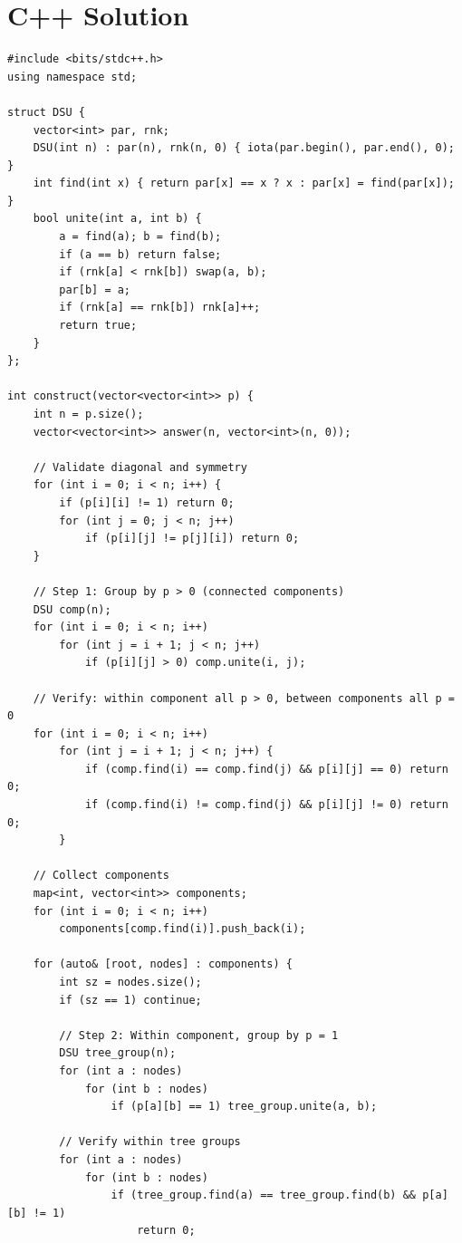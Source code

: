 \documentclass[11pt,a4paper]{article}
\begin{document}
\section{C++ Solution}

\begin{lstlisting}
#include <bits/stdc++.h>
using namespace std;

struct DSU {
    vector<int> par, rnk;
    DSU(int n) : par(n), rnk(n, 0) { iota(par.begin(), par.end(), 0); }
    int find(int x) { return par[x] == x ? x : par[x] = find(par[x]); }
    bool unite(int a, int b) {
        a = find(a); b = find(b);
        if (a == b) return false;
        if (rnk[a] < rnk[b]) swap(a, b);
        par[b] = a;
        if (rnk[a] == rnk[b]) rnk[a]++;
        return true;
    }
};

int construct(vector<vector<int>> p) {
    int n = p.size();
    vector<vector<int>> answer(n, vector<int>(n, 0));

    // Validate diagonal and symmetry
    for (int i = 0; i < n; i++) {
        if (p[i][i] != 1) return 0;
        for (int j = 0; j < n; j++)
            if (p[i][j] != p[j][i]) return 0;
    }

    // Step 1: Group by p > 0 (connected components)
    DSU comp(n);
    for (int i = 0; i < n; i++)
        for (int j = i + 1; j < n; j++)
            if (p[i][j] > 0) comp.unite(i, j);

    // Verify: within component all p > 0, between components all p = 0
    for (int i = 0; i < n; i++)
        for (int j = i + 1; j < n; j++) {
            if (comp.find(i) == comp.find(j) && p[i][j] == 0) return 0;
            if (comp.find(i) != comp.find(j) && p[i][j] != 0) return 0;
        }

    // Collect components
    map<int, vector<int>> components;
    for (int i = 0; i < n; i++)
        components[comp.find(i)].push_back(i);

    for (auto& [root, nodes] : components) {
        int sz = nodes.size();
        if (sz == 1) continue;

        // Step 2: Within component, group by p = 1
        DSU tree_group(n);
        for (int a : nodes)
            for (int b : nodes)
                if (p[a][b] == 1) tree_group.unite(a, b);

        // Verify within tree groups
        for (int a : nodes)
            for (int b : nodes)
                if (tree_group.find(a) == tree_group.find(b) && p[a][b] != 1)
                    return 0;


\end{lstlisting}
\end{document}
